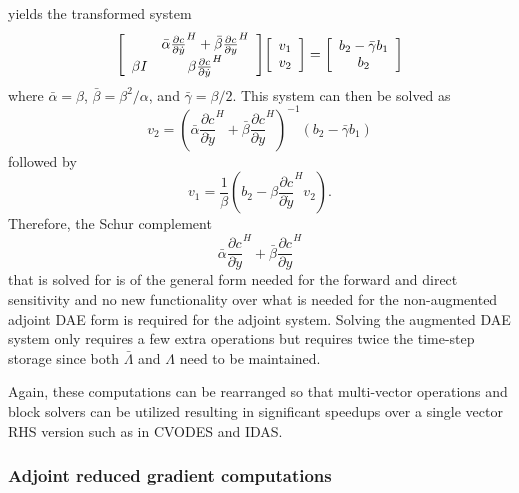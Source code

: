 \documentclass[pdf,ps2pdf,11pt]{SANDreport}
\begin{document}
%
yields the transformed system
%
\begin{equation}
{\bmat{cc}
 & \bar{\alpha} \frac{\partial c}{\partial \dot{y}}^H + \bar{\beta} \frac{\partial c}{\partial y}^H \\
\beta I &  \beta \frac{\partial c}{\partial \dot{y}}^H
\emat}
{\bmat{c} v_1 \\ v_2 \emat}
=
{\bmat{c}  b_2 - \bar{\gamma} b_1 \\ b_2 \emat}
\label{rythmos:eqn:aug-adj-sens-trans-system}
\end{equation}
%
where $\bar{\alpha}=\beta$, $\bar{\beta}=\beta^2/\alpha$, and
$\bar{\gamma}=\beta/2$.  This system can then be solved as
%
\[
v_2 = \left( \bar{\alpha} \frac{\partial c}{\partial \dot{y}}^H + \bar{\beta} \frac{\partial c}{\partial y}^H \right)^{-1}
\left(  b_2 - \bar{\gamma} b_1 \right)
\]
%
followed by
%
\[
v_1 = \frac{1}{\beta} \left( b_2 - \beta \frac{\partial c}{\partial \dot{y}}^H v_2 \right).
\]
%
Therefore, the Schur complement
%
\[
\bar{\alpha} \frac{\partial c}{\partial \dot{y}}^H + \bar{\beta} \frac{\partial c}{\partial y}^H
\]
%
that is solved for is of the general form needed for the forward and direct
sensitivity and no new functionality over what is needed for the non-augmented
adjoint DAE form is required for the adjoint system.  Solving the augmented
DAE system only requires a few extra operations but requires twice the
time-step storage since both $\bar{\Lambda}$ and $\Lambda$ need to be
maintained.

Again, these computations can be rearranged so that multi-vector operations
and block solvers can be utilized resulting in significant speedups over a
single vector RHS version such as in CVODES and IDAS.

\subsubsection{Adjoint reduced gradient computations}
\end{document}
